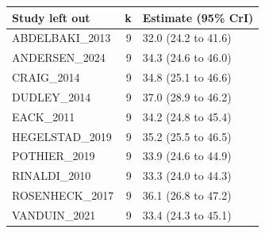 
\begin{tabular}{lrl}
\toprule
Study left out & k & Estimate (95\% CrI)\\
\midrule
ABDELBAKI\_2013 & 9 & 32.0 (24.2 to 41.6)\\
ANDERSEN\_2024 & 9 & 34.3 (24.6 to 46.0)\\
CRAIG\_2014 & 9 & 34.8 (25.1 to 46.6)\\
DUDLEY\_2014 & 9 & 37.0 (28.9 to 46.2)\\
EACK\_2011 & 9 & 34.2 (24.8 to 45.4)\\
HEGELSTAD\_2019 & 9 & 35.2 (25.5 to 46.5)\\
POTHIER\_2019 & 9 & 33.9 (24.6 to 44.9)\\
RINALDI\_2010 & 9 & 33.3 (24.0 to 44.3)\\
ROSENHECK\_2017 & 9 & 36.1 (26.8 to 47.2)\\
VANDUIN\_2021 & 9 & 33.4 (24.3 to 45.1)\\
\bottomrule
\end{tabular}
